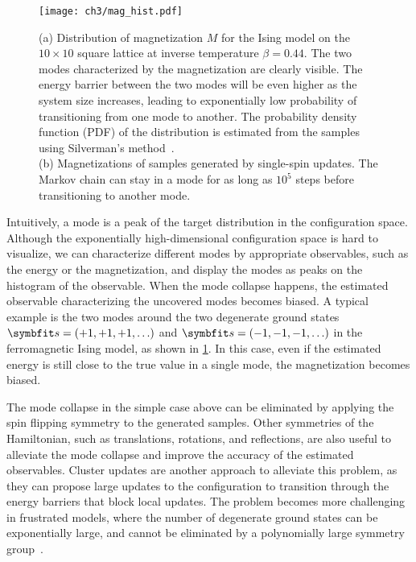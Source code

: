\begin{figure}[htb]
\centering
\texttt{[image: ch3/mag\_hist.pdf]}
\caption[Distribution and sampling of magnetization for Ising model]{
(a) Distribution of magnetization $M$ for the Ising model on the $10 \times 10$ square lattice at inverse temperature $\beta = 0.44$.
The two modes characterized by the magnetization are clearly visible.
The energy barrier between the two modes will be even higher as the system size increases, leading to exponentially low probability of transitioning from one mode to another.
The probability density function (PDF) of the distribution is estimated from the samples using Silverman’s method~\cite{silverman1986density}. \\
(b) Magnetizations of samples generated by single-spin updates. The Markov chain can stay in a mode for as long as $10^5$ steps before transitioning to another mode.
}
\label{fig:mag-hist}
\end{figure}

Intuitively, a mode is a peak of the target distribution in the configuration space. Although the exponentially high-dimensional configuration space is hard to visualize, we can characterize different modes by appropriate observables, such as the energy or the magnetization, and display the modes as peaks on the histogram of the observable. When the mode collapse happens, the estimated observable characterizing the uncovered modes becomes biased. A typical example is the two modes around the two degenerate ground states $\vs = (+1, +1, +1, \ldots)$ and $\vs = (-1, -1, -1, \ldots)$ in the ferromagnetic Ising model, as shown in \cref{fig:mag-hist}. In this case, even if the estimated energy is still close to the true value in a single mode, the magnetization becomes biased.

The mode collapse in the simple case above can be eliminated by applying the spin flipping symmetry to the generated samples. Other symmetries of the Hamiltonian, such as translations, rotations, and reflections, are also useful to alleviate the mode collapse and improve the accuracy of the estimated observables. Cluster updates are another approach to alleviate this problem, as they can propose large updates to the configuration to transition through the energy barriers that block local updates. The problem becomes more challenging in frustrated models, where the number of degenerate ground states can be exponentially large, and cannot be eliminated by a polynomially large symmetry group~\cite{wannier1950antiferromagnetism, mambrini1999residual, vanderstraeten2018residual}.

